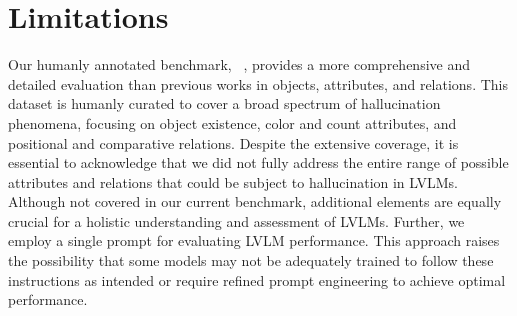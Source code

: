 \section{Limitations}

Our humanly annotated benchmark, \data~, provides a more comprehensive and detailed evaluation than previous works in objects, attributes, and relations. This dataset is humanly curated to cover a broad spectrum of hallucination phenomena, focusing on object existence, color and count attributes, and positional and comparative relations. Despite the extensive coverage, it is essential to acknowledge that we did not fully address the entire range of possible attributes and relations that could be subject to hallucination in LVLMs. Although not covered in our current benchmark, additional elements are equally crucial for a holistic understanding and assessment of LVLMs. Further, we employ a single prompt for evaluating LVLM performance. This approach raises the possibility that some models may not be adequately trained to follow these instructions as intended or require refined prompt engineering to achieve optimal performance. 